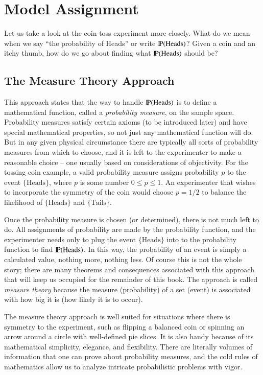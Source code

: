 \documentclass[captions=tableheading]{scrbook}
\begin{document}
\section{Model Assignment}
\label{sec-3-3}

\label{sec:Interpreting-Probabilities}

Let us take a look at the coin-toss experiment more closely. What do we mean when we say ``the probability of Heads'' or write \(\P(\mbox{Heads})\)? Given a coin and an itchy thumb, how do we go about finding what \(\P(\mbox{Heads})\) should be?
\subsection{The Measure Theory Approach}
\label{sec-3-3-1}


This approach states that the way to handle \(\P(\mbox{Heads})\) is to define a mathematical function, called a \emph{probability measure}, on the sample space. Probability measures satisfy certain axioms (to be introduced later) and have special mathematical properties, so not just any mathematical function will do. But in any given physical circumstance there are typically all sorts of probability measures from which to choose, and it is left to the experimenter to make a reasonable choice -- one usually based on considerations of objectivity. For the tossing coin example, a valid probability measure assigns probability \(p\) to the event \( \{ \mbox{Heads} \} \), where \(p\) is some number \(0\leq p\leq1\). An experimenter that wishes to incorporate the symmetry of the coin would choose \(p=1/2\) to balance the likelihood of \( \{\mbox{Heads} \} \) and \( \{ \mbox{Tails} \} \).

Once the probability measure is chosen (or determined), there is not much left to do. All assignments of probability are made by the probability function, and the experimenter needs only to plug the event \(\{ \mbox{Heads} \}\) into to the probability function to find \(\P(\mbox{Heads})\). In this way, the probability of an event is simply a calculated value, nothing more, nothing less. Of course this is not the whole story; there are many theorems and consequences associated with this approach that will keep us occupied for the remainder of this book. The approach is called \emph{measure theory} because the measure (probability) of a set (event) is associated with how big it is (how likely it is to occur).

The measure theory approach is well suited for situations where there is symmetry to the experiment, such as flipping a balanced coin or spinning an arrow around a circle with well-defined pie slices. It is also handy because of its mathematical simplicity, elegance, and flexibility. There are literally volumes of information that one can prove about probability measures, and the cold rules of mathematics allow us to analyze intricate probabilistic problems with vigor. 
\end{document}
